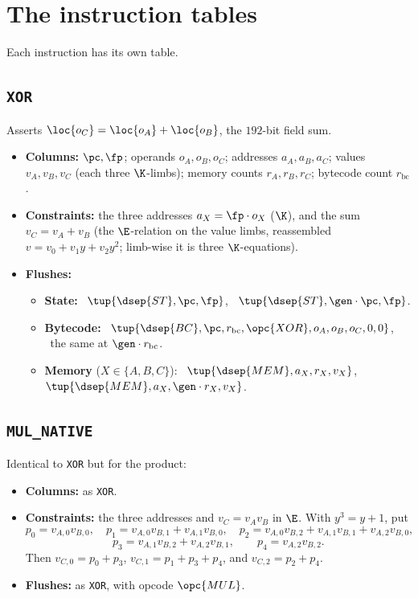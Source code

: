 \section{The instruction tables}\label{sec:tables}

Each instruction has its own table.

\subsection{\texttt{XOR}}\label{sec:tab-xor}

Asserts $\loc{o_C}=\loc{o_A}+\loc{o_B}$, the $192$-bit field sum.
\begin{itemize}
\item \textbf{Columns:} $\pc,\fp$; operands $o_A,o_B,o_C$; addresses $a_A,a_B,a_C$; values $v_A,v_B,v_C$ (each three $\K$-limbs); memory counts $r_A,r_B,r_C$; bytecode count $r_{\mathrm{bc}}$.
\item \textbf{Constraints:} the three addresses $a_X=\fp\cdot o_X$ ($\K$), and the sum $v_C=v_A+v_B$ (the $\E$-relation on the value limbs, reassembled $v=v_0+v_1 y+v_2y^2$; limb-wise it is three $\K$-equations).
\item \textbf{Flushes:}
  \begin{itemize}
  \item \textbf{State:} \pull\ $\tup{\dsep{ST},\pc,\fp}$, \push\ $\tup{\dsep{ST},\gen\cdot\pc,\fp}$.
  \item \textbf{Bytecode:} \pull\ $\tup{\dsep{BC},\pc,r_{\mathrm{bc}},\opc{XOR},o_A,o_B,o_C,0,0}$, \push\ the same at $\gen\cdot r_{\mathrm{bc}}$.
  \item \textbf{Memory} ($X\in\{A,B,C\}$): \pull\ $\tup{\dsep{MEM},a_X,r_X,v_X}$, \push\ $\tup{\dsep{MEM},a_X,\gen\cdot r_X,v_X}$.
  \end{itemize}
\end{itemize}

\subsection{\texttt{MUL\_NATIVE}}\label{sec:tab-mul}

Identical to \texttt{XOR} but for the product:
\begin{itemize}
\item \textbf{Columns:} as \texttt{XOR}.
\item \textbf{Constraints:} the three addresses and $v_C=v_Av_B$ in $\E$. With $y^3=y+1$, put
\[
p_0=v_{A,0}v_{B,0},\quad
p_1=v_{A,0}v_{B,1}+v_{A,1}v_{B,0},\quad
p_2=v_{A,0}v_{B,2}+v_{A,1}v_{B,1}+v_{A,2}v_{B,0},
\]
\[
p_3=v_{A,1}v_{B,2}+v_{A,2}v_{B,1},\qquad
p_4=v_{A,2}v_{B,2}.
\]
Then $v_{C,0}=p_0+p_3$, $v_{C,1}=p_1+p_3+p_4$, and $v_{C,2}=p_2+p_4$.
\item \textbf{Flushes:} as \texttt{XOR}, with opcode $\opc{MUL}$.
\end{itemize}

